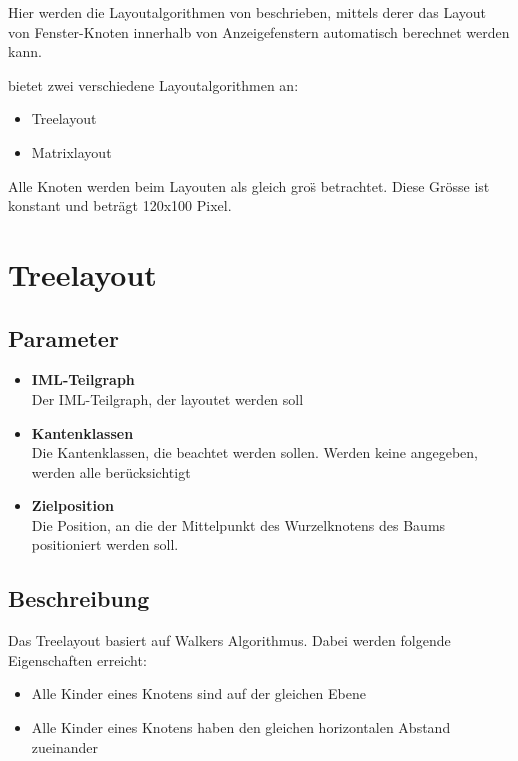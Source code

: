 %
%
%

Hier werden die Layoutalgorithmen von \product beschrieben, mittels
derer das Layout von Fenster-Knoten innerhalb von Anzeigefenstern
automatisch berechnet werden kann.

\product bietet zwei verschiedene Layoutalgorithmen an:
\begin{itemize}
  \item Treelayout
  \item Matrixlayout
\end{itemize}

Alle Knoten werden beim Layouten als gleich gro\"s betrachtet. Diese Gr\"osse ist konstant und betr\"agt 120x100 Pixel.

\section{Treelayout}
\subsection{Parameter}
\begin{itemize}
  \item \textbf{IML-Teilgraph}\\
Der IML-Teilgraph, der layoutet werden soll
  \item \textbf{Kantenklassen}\\
Die Kantenklassen, die beachtet werden sollen. Werden keine angegeben, werden alle ber\"ucksichtigt
  \item \textbf{Zielposition}\\
Die Position, an die der Mittelpunkt des Wurzelknotens des Baums positioniert werden soll.
\end{itemize}

\subsection{Beschreibung}
Das Treelayout basiert auf Walkers Algorithmus. Dabei werden folgende Eigenschaften erreicht:
\begin{itemize}
   \item Alle Kinder eines Knotens sind auf der gleichen Ebene
   \item Alle Kinder eines Knotens haben den gleichen horizontalen Abstand zueinander
\end{itemize}

